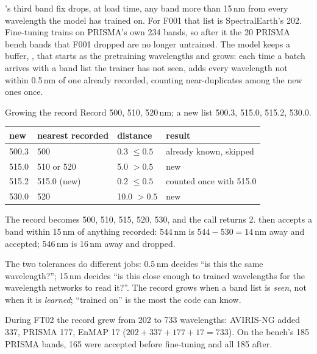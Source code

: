 's third band fix drops, at load time, any band more than 15\,nm from every wavelength the model has trained on. For F001 that list is
SpectralEarth's 202. Fine-tuning trains on PRISMA's own 234 bands, so after it the 20 PRISMA bench bands that F001 dropped are no longer untrained. The
model keeps a buffer, , that starts as the pretraining wavelengths and grows: each time a batch arrives with a band list the trainer has
not seen,  adds every wavelength not within 0.5\,nm of one already recorded, counting near-duplicates among the new ones
once.

\begin{worked}[label={we:finetune:record}]{Growing the record}
Record 500, 510, 520\,nm; a new list 500.3, 515.0, 515.2, 530.0.
\begin{center}
\begin{tabular}{llll}
\toprule
new & nearest recorded & distance & result\\
\midrule
500.3 & 500 & 0.3 $\le 0.5$ & already known, skipped\\
515.0 & 510 or 520 & 5.0 $> 0.5$ & new\\
515.2 & 515.0 (new) & 0.2 $\le 0.5$ & counted once with 515.0\\
530.0 & 520 & 10.0 $> 0.5$ & new\\
\bottomrule
\end{tabular}
\end{center}
The record becomes 500, 510, 515, 520, 530, and the call returns 2.  then accepts a band within 15\,nm of anything recorded: 544\,nm
is $544 - 530 = 14$\,nm away and accepted; 546\,nm is 16\,nm away and dropped.
\end{worked}
The two tolerances do different jobs: 0.5\,nm decides ``is this the same wavelength?''; 15\,nm decides ``is this close enough to trained wavelengths for the
wavelength networks to read it?''. The record grows when a band list is \emph{seen}, not when it is \emph{learned}; ``trained on'' is the most the code can
know.

\begin{drift}
During FT02 the record grew from 202 to 733 wavelengths: AVIRIS-NG added 337, PRISMA 177, EnMAP 17 ($202 + 337 + 177 + 17 = 733$).\tbrk{}
On the bench's 185 PRISMA bands, 165 were accepted before fine-tuning and all 185 after.
\end{drift}


